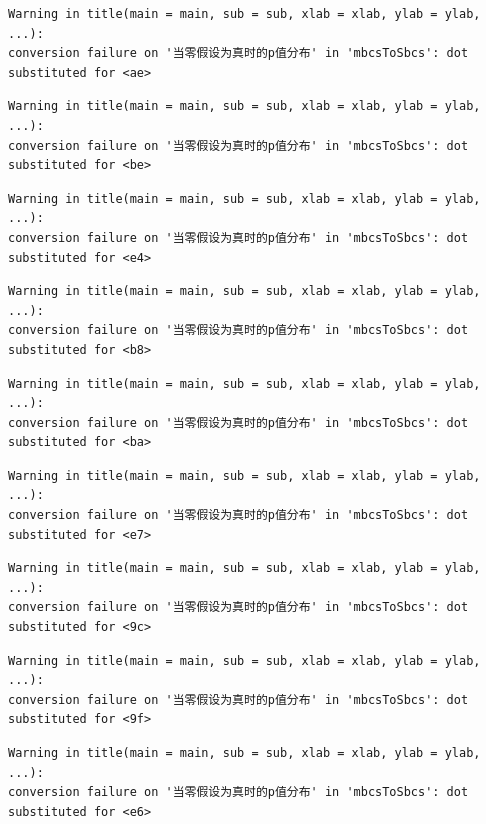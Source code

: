 \documentclass[
  letterpaper,
  DIV=11,
  numbers=noendperiod]{scrreprt}
\begin{document}
\begin{verbatim}
Warning in title(main = main, sub = sub, xlab = xlab, ylab = ylab, ...):
conversion failure on '当零假设为真时的p值分布' in 'mbcsToSbcs': dot
substituted for <ae>
\end{verbatim}

\begin{verbatim}
Warning in title(main = main, sub = sub, xlab = xlab, ylab = ylab, ...):
conversion failure on '当零假设为真时的p值分布' in 'mbcsToSbcs': dot
substituted for <be>
\end{verbatim}

\begin{verbatim}
Warning in title(main = main, sub = sub, xlab = xlab, ylab = ylab, ...):
conversion failure on '当零假设为真时的p值分布' in 'mbcsToSbcs': dot
substituted for <e4>
\end{verbatim}

\begin{verbatim}
Warning in title(main = main, sub = sub, xlab = xlab, ylab = ylab, ...):
conversion failure on '当零假设为真时的p值分布' in 'mbcsToSbcs': dot
substituted for <b8>
\end{verbatim}

\begin{verbatim}
Warning in title(main = main, sub = sub, xlab = xlab, ylab = ylab, ...):
conversion failure on '当零假设为真时的p值分布' in 'mbcsToSbcs': dot
substituted for <ba>
\end{verbatim}

\begin{verbatim}
Warning in title(main = main, sub = sub, xlab = xlab, ylab = ylab, ...):
conversion failure on '当零假设为真时的p值分布' in 'mbcsToSbcs': dot
substituted for <e7>
\end{verbatim}

\begin{verbatim}
Warning in title(main = main, sub = sub, xlab = xlab, ylab = ylab, ...):
conversion failure on '当零假设为真时的p值分布' in 'mbcsToSbcs': dot
substituted for <9c>
\end{verbatim}

\begin{verbatim}
Warning in title(main = main, sub = sub, xlab = xlab, ylab = ylab, ...):
conversion failure on '当零假设为真时的p值分布' in 'mbcsToSbcs': dot
substituted for <9f>
\end{verbatim}

\begin{verbatim}
Warning in title(main = main, sub = sub, xlab = xlab, ylab = ylab, ...):
conversion failure on '当零假设为真时的p值分布' in 'mbcsToSbcs': dot
substituted for <e6>
\end{verbatim}
\end{document}
